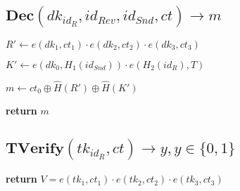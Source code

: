 \documentclass[a4paper]{article}
\begin{document}
\subsection{$\textbf{Dec}(\textit{dk}_{\textit{id}_R}, \textit{id}_\textit{Rev}, \textit{id}_\textit{Snd}, \textit{ct}) \rightarrow m$}

$R' \gets e(\textit{dk}_1, \textit{ct}_1) \cdot e(\textit{dk}_2, \textit{ct}_2) \cdot e(\textit{dk}_3, \textit{ct}_3)$

$K' \gets e(\textit{dk}_0, H_1(\textit{id}_\textit{Snd})) \cdot e(H_2(\textit{id}_R), T)$

$m \gets \textit{ct}_0 \oplus \hat{H}(R') \oplus \hat{H}(K')$

\textbf{return} $m$

\subsection{$\textbf{TVerify}(\textit{tk}_{\textit{id}_R}, \textit{ct}) \rightarrow y, y \in \{0, 1\}$}

\textbf{return} $V = e(\textit{tk}_1, \textit{ct}_1) \cdot e(\textit{tk}_2, \textit{ct}_2) \cdot e(\textit{tk}_3, \textit{ct}_3)$
\end{document}
